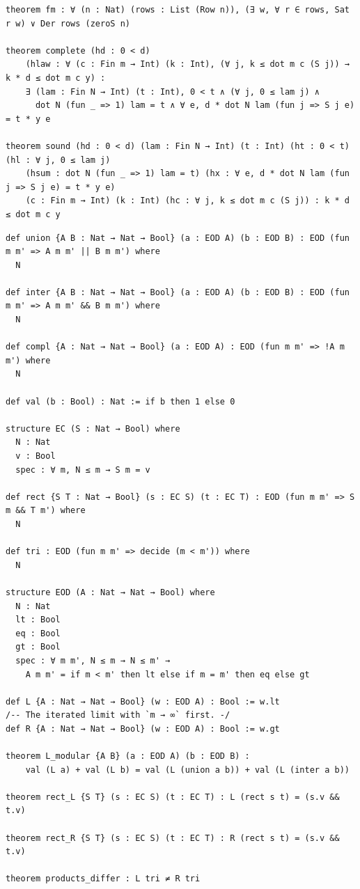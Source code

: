 \begin{lstlisting}
theorem fm : ∀ (n : Nat) (rows : List (Row n)), (∃ w, ∀ r ∈ rows, Sat r w) ∨ Der rows (zeroS n)

theorem complete (hd : 0 < d)
    (hlaw : ∀ (c : Fin m → Int) (k : Int), (∀ j, k ≤ dot m c (S j)) → k * d ≤ dot m c y) :
    ∃ (lam : Fin N → Int) (t : Int), 0 < t ∧ (∀ j, 0 ≤ lam j) ∧
      dot N (fun _ => 1) lam = t ∧ ∀ e, d * dot N lam (fun j => S j e) = t * y e

theorem sound (hd : 0 < d) (lam : Fin N → Int) (t : Int) (ht : 0 < t) (hl : ∀ j, 0 ≤ lam j)
    (hsum : dot N (fun _ => 1) lam = t) (hx : ∀ e, d * dot N lam (fun j => S j e) = t * y e)
    (c : Fin m → Int) (k : Int) (hc : ∀ j, k ≤ dot m c (S j)) : k * d ≤ dot m c y
\end{lstlisting}

\label{lean:constr-fubini}
\begin{lstlisting}
def union {A B : Nat → Nat → Bool} (a : EOD A) (b : EOD B) : EOD (fun m m' => A m m' || B m m') where
  N

def inter {A B : Nat → Nat → Bool} (a : EOD A) (b : EOD B) : EOD (fun m m' => A m m' && B m m') where
  N

def compl {A : Nat → Nat → Bool} (a : EOD A) : EOD (fun m m' => !A m m') where
  N

def val (b : Bool) : Nat := if b then 1 else 0

structure EC (S : Nat → Bool) where
  N : Nat
  v : Bool
  spec : ∀ m, N ≤ m → S m = v

def rect {S T : Nat → Bool} (s : EC S) (t : EC T) : EOD (fun m m' => S m && T m') where
  N

def tri : EOD (fun m m' => decide (m < m')) where
  N

structure EOD (A : Nat → Nat → Bool) where
  N : Nat
  lt : Bool
  eq : Bool
  gt : Bool
  spec : ∀ m m', N ≤ m → N ≤ m' →
    A m m' = if m < m' then lt else if m = m' then eq else gt

def L {A : Nat → Nat → Bool} (w : EOD A) : Bool := w.lt
/-- The iterated limit with `m → ∞` first. -/
def R {A : Nat → Nat → Bool} (w : EOD A) : Bool := w.gt

theorem L_modular {A B} (a : EOD A) (b : EOD B) :
    val (L a) + val (L b) = val (L (union a b)) + val (L (inter a b))

theorem rect_L {S T} (s : EC S) (t : EC T) : L (rect s t) = (s.v && t.v)

theorem rect_R {S T} (s : EC S) (t : EC T) : R (rect s t) = (s.v && t.v)

theorem products_differ : L tri ≠ R tri
\end{lstlisting}

